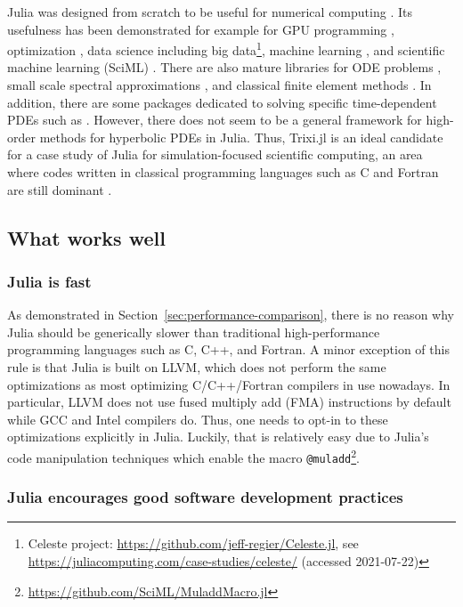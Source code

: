\documentclass{juliacon}
\newcommand{\trixi}{Trixi.jl\xspace}
\begin{document}
Julia was designed from scratch to be useful for numerical computing
\cite{bezanson2017julia}. Its usefulness has been demonstrated for example for
GPU programming \cite{besard2018juliagpu, omlin2020solving},
optimization \cite{dunning2017jump}, data science including
big data\footnote{Celeste project: \url{https://github.com/jeff-regier/Celeste.jl},
see \url{https://juliacomputing.com/case-studies/celeste/} (accessed 2021-07-22)},
machine learning \cite{innes2018fashionable}, and scientific machine learning
(SciML) \cite{pal2021opening}. There are also mature libraries for ODE problems
\cite{rackauckas2017differentialequations}, small scale spectral approximations
\cite{olver2014practical}, and classical finite element methods \cite{badia2020gridap}.
In addition, there are some packages dedicated to solving specific time-dependent
PDEs such as \cite{ramadhan2020oceananigans, constantinou2021geophysicalflows}.
However, there does not seem to be a general framework for high-order methods
for hyperbolic PDEs in Julia. Thus, \trixi is an ideal candidate for a case study
of Julia for simulation-focused scientific computing, an area where codes written
in classical programming languages such as C and Fortran are still dominant
\cite{krais2021flexi, parsani2021ssdc}.

\subsection{What works well}

\subsubsection{Julia is fast}

As demonstrated in Section~\ref{sec:performance-comparison}, there is no reason
why Julia should be generically slower than traditional high-performance programming
languages such as C, C++, and Fortran. A minor exception of this rule is that
Julia is built on LLVM, which does not perform the same optimizations as most
optimizing C/C++/Fortran compilers in use nowadays. In particular, LLVM does
not use fused multiply add (FMA) instructions by default while GCC and Intel
compilers do. Thus, one needs to opt-in to these optimizations explicitly in
Julia. Luckily, that is relatively easy due to Julia's code manipulation
techniques which enable the macro \lstinline{@muladd}\footnote{\url{https://github.com/SciML/MuladdMacro.jl}}.

\subsubsection{Julia encourages good software development practices}
\end{document}
